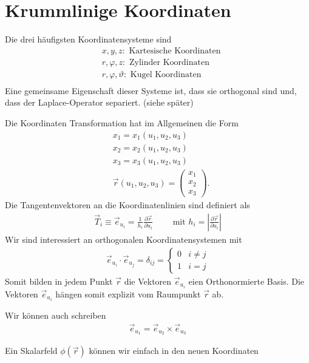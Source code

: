 \section{Krummlinige Koordinaten}
Die drei häufigsten Koordinatensysteme sind
\begin{align*}
&x,y,z : \text{ Kartesische Koordinaten}\\
&r,\varphi,z : \text{ Zylinder Koordinaten}\\
&r,\varphi,\vartheta : \text{ Kugel Koordinaten}\\
\end{align*}
Eine gemeinsame Eigenschaft dieser Systeme ist, dass sie orthogonal sind und,
dass der Laplace-Operator separiert. (siehe später)
\par
Die Koordinaten Transformation hat im Allgemeinen die Form
\begin{align*}
&x_1 = x_1(u_1,u_2,u_3)\\
&x_2 = x_2(u_1,u_2,u_3)\\
&x_3 = x_3(u_1,u_2,u_3)\\
&\vec{r}(u_1,u_2,u_3) = \begin{pmatrix}x_1\\x_2\\x_3\end{pmatrix}.
\end{align*}
Die Tangentenvektoren an die Koordinatenlinien sind definiert als
\begin{align*}
\vec{T}_i \equiv \vec{e}_{u_i} = \frac{1}{h_i}\frac{\partial\vec{r}}{\partial
u_i}\qquad \text{ mit } h_i = \left|\frac{\partial\vec{r}}{\partial u_i} \right|
\end{align*}
Wir sind interessiert an orthogonalen Koordinatensystemen mit
\begin{align*}
\vec{e}_{u_i} \cdot \vec{e}_{u_j} = \delta_{ij} = \begin{cases}0 &
i\neq j\\1 &i = j\end{cases}
\end{align*}
Somit bilden in jedem Punkt $\vec{r}$ die Vektoren $\vec{e}_{u_i}$ eien
Orthonormierte Basis. Die Vektoren $\vec{e}_{u_i}$ hängen somit explizit vom
Raumpunkt $\vec{r}$ ab.
\begin{Bemerkung}
Wir können auch schreiben
\begin{align*}
\vec{e}_{u_1} = \vec{e}_{u_2} \times \vec{e}_{u_3}
\end{align*}
\end{Bemerkung}
Ein Skalarfeld $\phi(\vec{r})$ können wir einfach in den neuen Koordinaten
